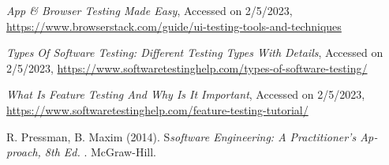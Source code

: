 {\begin{latin}
	\begingroup
	\renewcommand{\section}[2]{}%
	
\begin{thebibliography}{9}
	
	\textit{App \& Browser Testing Made Easy},
	Accessed on 2/5/2023,
	\url{https://www.browserstack.com/guide/ui-testing-tools-and-techniques}
	
	\textit{Types Of Software Testing: Different Testing Types With Details},
	Accessed on 2/5/2023,
	\url{https://www.softwaretestinghelp.com/types-of-software-testing/}

\textit{What Is Feature Testing And Why Is It Important},
Accessed on 2/5/2023,
\url{	https://www.softwaretestinghelp.com/feature-testing-tutorial/}
	
R. Pressman,   B. Maxim (2014).
S\textit{software Engineering: A Practitioner’s Approach, 8th Ed. }.
McGraw-Hill.

\end{thebibliography}
\endgroup
\end{latin}

}
